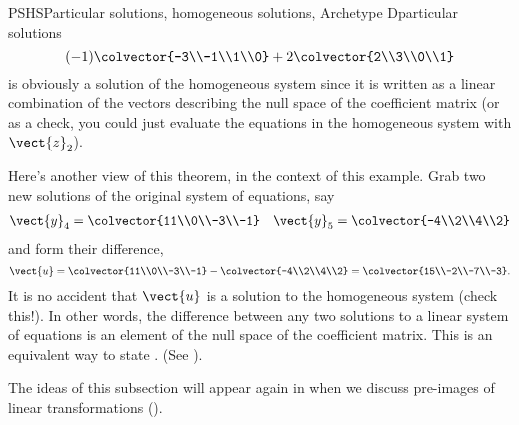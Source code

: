 \begin{example}{PSHS}{Particular solutions, homogeneous solutions, Archetype D}{particular solutions}
\begin{equation*}
(-1)\colvector{-3\\-1\\1\\0}+2\colvector{2\\3\\0\\1}
\end{equation*}
%
is obviously a solution of the homogeneous system since it is written as a linear combination of the vectors describing the null space of the coefficient matrix (or as a check, you could just evaluate the equations in the homogeneous system with $\vect{z}_2$).\par
%
Here's another view of this theorem, in the context of this example.  Grab two new solutions of the original system of equations, say
%
\begin{align*}
\vect{y}_4=\colvector{11\\0\\-3\\-1}&&
\vect{y}_5=\colvector{-4\\2\\4\\2}
\end{align*}
%
and form their difference,
%
\begin{equation*}
\vect{u}=\colvector{11\\0\\-3\\-1}-\colvector{-4\\2\\4\\2}=\colvector{15\\-2\\-7\\-3}.
\end{equation*}
%
It is no accident that $\vect{u}$ is a solution to the homogeneous system (check this!).  In other words, the difference between any two solutions to a linear system of equations is an element of the null space of the coefficient matrix.  This is an equivalent way to state .   (See ).
\end{example}
%
The ideas of this subsection will appear again in  when we discuss pre-images of linear transformations ().
%
%


